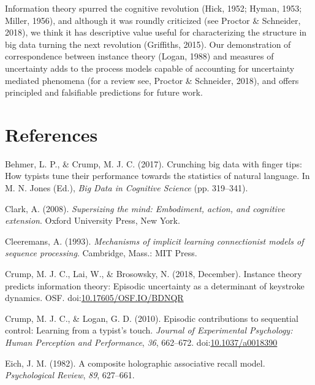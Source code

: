 \documentclass[,man,floatsintext]{apa6}
\begin{document}
Information theory spurred the cognitive revolution (Hick, 1952; Hyman, 1953; Miller, 1956), and although it was roundly criticized (see Proctor \& Schneider, 2018), we think it has descriptive value useful for characterizing the structure in big data turning the next revolution (Griffiths, 2015). Our demonstration of correspondence between instance theory (Logan, 1988) and measures of uncertainty adds to the process models capable of accounting for uncertainty mediated phenomena (for a review see, Proctor \& Schneider, 2018), and offers principled and falsifiable predictions for future work.

\newpage

\hypertarget{references}{%
\section{References}\label{references}}

\begingroup
\setlength{\parindent}{-0.5in}
\setlength{\leftskip}{0.5in}

\hypertarget{refs}{}
\leavevmode\hypertarget{ref-behmer_crunching_2017}{}%
Behmer, L. P., \& Crump, M. J. C. (2017). Crunching big data with finger tips: How typists tune their performance towards the statistics of natural language. In M. N. Jones (Ed.), \emph{Big Data in Cognitive Science} (pp. 319--341).

\leavevmode\hypertarget{ref-clark_supersizing_2008}{}%
Clark, A. (2008). \emph{Supersizing the mind: Embodiment, action, and cognitive extension}. Oxford University Press, New York.

\leavevmode\hypertarget{ref-cleeremans_mechanisms_1993}{}%
Cleeremans, A. (1993). \emph{Mechanisms of implicit learning connectionist models of sequence processing}. Cambridge, Mass.: MIT Press.

\leavevmode\hypertarget{ref-Crump_Lai_Brosowsky_2018}{}%
Crump, M. J. C., Lai, W., \& Brosowsky, N. (2018, December). Instance theory predicts information theory: Episodic uncertainty as a determinant of keystroke dynamics. OSF. doi:\href{https://doi.org/10.17605/OSF.IO/BDNQR}{10.17605/OSF.IO/BDNQR}

\leavevmode\hypertarget{ref-crump_episodic_2010}{}%
Crump, M. J. C., \& Logan, G. D. (2010). Episodic contributions to sequential control: Learning from a typist's touch. \emph{Journal of Experimental Psychology: Human Perception and Performance}, \emph{36}, 662--672. doi:\href{https://doi.org/10.1037/a0018390}{10.1037/a0018390}

\leavevmode\hypertarget{ref-eich_composite_1982}{}%
Eich, J. M. (1982). A composite holographic associative recall model. \emph{Psychological Review}, \emph{89}, 627--661.
\end{document}
